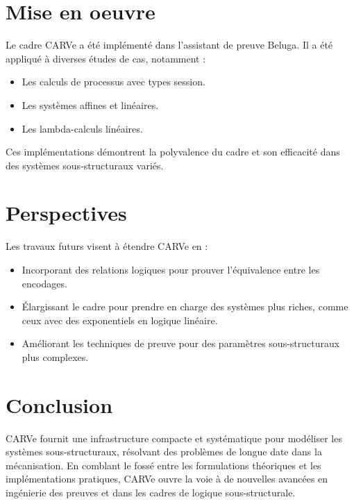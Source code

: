 \section{Mise en oeuvre}
Le cadre CARVe a été implémenté dans l'assistant de preuve Beluga. Il a été appliqué à diverses études de cas, notamment :

\begin{itemize}
    \item Les calculs de processus avec types session.
    \item Les systèmes affines et linéaires.
    \item Les lambda-calculs linéaires.
\end{itemize}

Ces implémentations démontrent la polyvalence du cadre et son efficacité dans des systèmes sous-structuraux variés.

\section{Perspectives}
Les travaux futurs visent à étendre CARVe en :

\begin{itemize}
    \item Incorporant des relations logiques pour prouver l'équivalence entre les encodages.
    \item Élargissant le cadre pour prendre en charge des systèmes plus riches, comme ceux avec des exponentiels en logique linéaire.
    \item Améliorant les techniques de preuve pour des paramètres sous-structuraux plus complexes.
\end{itemize}

\section{Conclusion}
CARVe fournit une infrastructure compacte et systématique pour modéliser les systèmes sous-structuraux, résolvant des problèmes de longue date dans la mécanisation. En comblant le fossé entre les formulations théoriques et les implémentations pratiques, CARVe ouvre la voie à de nouvelles avancées en ingénierie des preuves et dans les cadres de logique sous-structurale.
